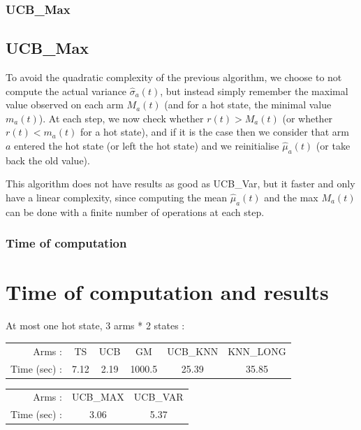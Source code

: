 \documentclass[french]{beamer}
\begin{document}
\begin{frame}
	\frametitle{UCB\_Max}
	
	\subsection{UCB\_Max}
	
	To avoid the quadratic complexity of the previous algorithm, we choose to not compute
	the actual variance $\hat\sigma_a(t)$, but instead simply remember the maximal value
	observed on each arm $M_a(t)$ (and for a hot state, the minimal value $m_a(t)$).
	At each step, we now check whether $r(t) > M_a(t)$ (or whether $r(t) < m_a(t)$ for a hot state),
	and if it is the case then we consider that arm $a$ entered the hot state (or left the hot state)
	and we reinitialise $\hat\mu_a(t)$ (or take back the old value).
	
	This algorithm does not have results as good as UCB\_Var, but it faster and only have
	a linear complexity, since computing the mean $\hat\mu_a(t)$ and the max $M_a(t)$
	can be done with a finite number of operations at each step.
	
\end{frame}

\begin{frame}
	\frametitle{Time of computation}
	
	\section{Time of computation and results}
	
	 At most one hot state, 3 arms * 2 states :
	 \newline
	 
	 
	 	\begin{tabular}{rccccc}
	 		Arms : & TS & UCB & GM & UCB\_KNN & KNN\_LONG \\
	 		Time (sec) : & 7.12 & 2.19 & 1000.5 & 25.39 & 35.85
	 	\end{tabular}
	 	\newline
	 	\newline
	 	
	 	\begin{tabular}{rcc}
	 		Arms : & UCB\_MAX & UCB\_VAR \\
	 		Time (sec) : & 3.06 & 5.37
	 	\end{tabular}
	 
\end{frame}
\end{document}
